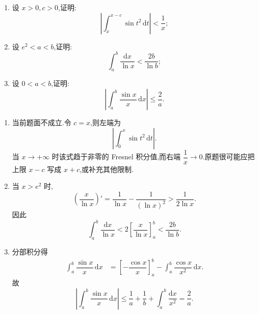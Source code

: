 \begin{example}
    \begin{enumerate}
        \item 设 $x>0,c>0$,证明:
              \[
                  \left|\int_x^{x-c}\sin t^2\,\mathrm{d}t\right|<\dfrac{1}{x};
              \]
        \item 设 $e^2<a<b$,证明:
              \[
                  \displaystyle\int_a^b\dfrac{\mathrm{d}x}{\ln x}<\dfrac{2b}{\ln b};
              \]
        \item 设 $0<a<b$,证明:
              \[
                  \left|\int_a^b\dfrac{\sin x}{x}\,\mathrm{d}x\right|\leq\dfrac{2}{a}.
              \]
    \end{enumerate}
\end{example}
\exampleblank

\begin{solution}
    \leavevmode
    \begin{enumerate}
        \item 当前题面不成立.令 $c=x$,则左端为
              \[
                  \left|\int_0^x\sin t^2\,\mathrm{d}t\right|.
              \]
              当 $x\to+\infty$ 时该式趋于非零的 Fresnel 积分值,而右端 $\dfrac{1}{x}\to0$.原题很可能应把上限 $x-c$ 写成 $x+c$,或补充其他限制.

        \item 当 $x>e^2$ 时,
              \[
                  \left(\dfrac{x}{\ln x}\right)'
                  =\dfrac{1}{\ln x}-\dfrac{1}{(\ln x)^2}
                  >\dfrac{1}{2\ln x}.
              \]
              因此
              \[
                  \displaystyle\int_a^b\dfrac{\mathrm{d}x}{\ln x}
                  <2\left[\dfrac{x}{\ln x}\right]_a^b
                  <\dfrac{2b}{\ln b}.
              \]

        \item 分部积分得
              \[
                  \begin{aligned}
                      \int_a^b\dfrac{\sin x}{x}\,\mathrm{d}x
                       & =\left[-\dfrac{\cos x}{x}\right]_a^b
                      -\int_a^b\dfrac{\cos x}{x^2}\,\mathrm{d}x.
                  \end{aligned}
              \]
              故
              \[
                  \left|\int_a^b\dfrac{\sin x}{x}\,\mathrm{d}x\right|
                  \leq\dfrac{1}{a}+\dfrac{1}{b}
                  +\int_a^b\dfrac{\mathrm{d}x}{x^2}
                  =\dfrac{2}{a}.
              \]
    \end{enumerate}
\end{solution}

